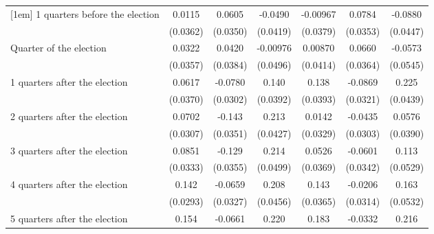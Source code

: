 \begin{table}[!ht]
\begin{tabular}{l*{6}{c}}
[1em]
 1 quarters before the election&      0.0115         &      0.0605         &     -0.0490         &    -0.00967         &      0.0784\sym{*}  &     -0.0880\sym{*}  \\
                    &    (0.0362)         &    (0.0350)         &    (0.0419)         &    (0.0379)         &    (0.0353)         &    (0.0447)         \\
[1em]
Quarter of the election&      0.0322         &      0.0420         &    -0.00976         &     0.00870         &      0.0660         &     -0.0573         \\
                    &    (0.0357)         &    (0.0384)         &    (0.0496)         &    (0.0414)         &    (0.0364)         &    (0.0545)         \\
[1em]
 1 quarters after the election&      0.0617         &     -0.0780\sym{**} &       0.140\sym{***}&       0.138\sym{***}&     -0.0869\sym{**} &       0.225\sym{***}\\
                    &    (0.0370)         &    (0.0302)         &    (0.0392)         &    (0.0393)         &    (0.0321)         &    (0.0439)         \\
[1em]
 2 quarters after the election&      0.0702\sym{*}  &      -0.143\sym{***}&       0.213\sym{***}&      0.0142         &     -0.0435         &      0.0576         \\
                    &    (0.0307)         &    (0.0351)         &    (0.0427)         &    (0.0329)         &    (0.0303)         &    (0.0390)         \\
[1em]
 3 quarters after the election&      0.0851\sym{*}  &      -0.129\sym{***}&       0.214\sym{***}&      0.0526         &     -0.0601         &       0.113\sym{*}  \\
                    &    (0.0333)         &    (0.0355)         &    (0.0499)         &    (0.0369)         &    (0.0342)         &    (0.0529)         \\
[1em]
 4 quarters after the election&       0.142\sym{***}&     -0.0659\sym{*}  &       0.208\sym{***}&       0.143\sym{***}&     -0.0206         &       0.163\sym{**} \\
                    &    (0.0293)         &    (0.0327)         &    (0.0456)         &    (0.0365)         &    (0.0314)         &    (0.0532)         \\
[1em]
 5 quarters after the election&       0.154\sym{***}&     -0.0661\sym{*}  &       0.220\sym{***}&       0.183\sym{***}&     -0.0332         &       0.216\sym{***}\\

\end{tabular}
\end{table}
